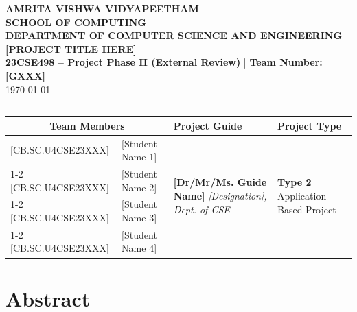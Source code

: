 \documentclass[11pt, a4paper]{article}
\begin{document}
\noindent
\begin{minipage}{\textwidth}
    \centering
    {\Large \textbf{\textcolor{amritaMaroon}{
    AMRITA VISHWA VIDYAPEETHAM \\
    SCHOOL OF COMPUTING \\
    DEPARTMENT OF COMPUTER SCIENCE AND ENGINEERING \\
    }}}
    \vspace{0.2cm}
    {\large \textbf{[PROJECT TITLE HERE]}} \\[0.1cm]
    \textbf{23CSE498 -- Project Phase II (External Review)} \quad | \quad \textbf{Team Number: [GXXX]} \\
    \today
\end{minipage}

\vspace{0.3cm}
\hrule
\vspace{0.3cm}

\noindent
\begin{center}
    \renewcommand{\arraystretch}{1.45}
    \setlength{\tabcolsep}{6pt}
    \begin{tabular}{|l|p{4.8cm}|p{4.6cm}|p{3.2cm}|}
        \hline
        \multicolumn{2}{|c|}{\textbf{Team Members}} & \textbf{Project Guide} & \textbf{Project Type} \\
        \hline
        \small [CB.SC.U4CSE23XXX] & \small \raggedright [Student Name 1] &
        \multirow{4}{=}{\raggedright \small \textbf{[Dr/Mr/Ms. Guide Name]} \newline \textit{[Designation], \newline Dept. of CSE}} &
        \multirow{4}{=}{\raggedright \small \textbf{Type 2} \newline Application-Based Project} \\ \cline{1-2}
        \small [CB.SC.U4CSE23XXX] & \small [Student Name 2] & & \\ \cline{1-2}
        \small [CB.SC.U4CSE23XXX] & \small [Student Name 3] & & \\ \cline{1-2}
        \small [CB.SC.U4CSE23XXX] & \small [Student Name 4] & & \\
        \hline
    \end{tabular}
\end{center}
\vspace{0.2cm}

\section{Abstract}
\end{document}
